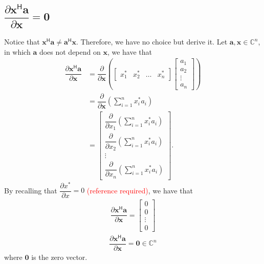 \documentclass{article}
\newcommand{\hermit}{\mathsf{H}}
\newcommand{\obs}[1]{\textcolor{red}{(#1)}}
\begin{document}
\subsection{\(\dfrac{\partial \mathbf{x}^\hermit \mathbf{a}}{\partial \mathbf{x}} = \mathbf{0}\)}
Notice that \(\mathbf{x}^\hermit \mathbf{a} \neq \mathbf{a}^\hermit \mathbf{x}\). Therefore, we have no choice but derive it. Let \(\mathbf{a, x} \in \mathbb{C}^{n}\), in which \(\mathbf{a}\) does not depend on \(\mathbf{x}\), we have that
\begin{align}
    \dfrac{\partial \mathbf{x}^\hermit \mathbf{a}}{\partial\mathbf{x}} & = \dfrac{\partial}{\partial\mathbf{x}} \left(
    \begin{bmatrix}
        x^*_1 & x^*_2 & \dots & x^*_n
    \end{bmatrix} \begin{bmatrix}
        a_{1} \\ a_{2} \\ \vdots \\ a_{n}
    \end{bmatrix} \right) \\
    & = \dfrac{\partial}{\partial\mathbf{x}} \left( \sum_{i = 1}^n x^*_ia_i \right) \\
    &= \begin{bmatrix}
            \dfrac{\partial}{\partial x_1} \left( \sum_{i = 1}^n x^*_ia_i \right) \\ \dfrac{\partial}{\partial x_2} \left( \sum_{i = 1}^n x^*_ia_i \right) \\ \vdots \\
            \dfrac{\partial}{\partial x_n} \left( \sum_{i = 1}^n x^*_ia_i \right)
        \end{bmatrix}.
\end{align}
By recalling that \(\dfrac{\partial x^*}{\partial x} = 0\) \obs{reference required}, we have that
\begin{align}
    \dfrac{\partial \mathbf{x}^\hermit \mathbf{a}}{\partial\mathbf{x}} = \begin{bmatrix}
        0 \\ 0 \\ \vdots \\ 0
    \end{bmatrix}
\end{align}
\begin{align}
    \boxed{\dfrac{\partial \mathbf{x}^\hermit \mathbf{a}}{\partial\mathbf{x}} = \mathbf{0} \in \mathbb{C}^{n}}
\end{align}
where \(\mathbf{0}\) is the zero vector.
\end{document}
